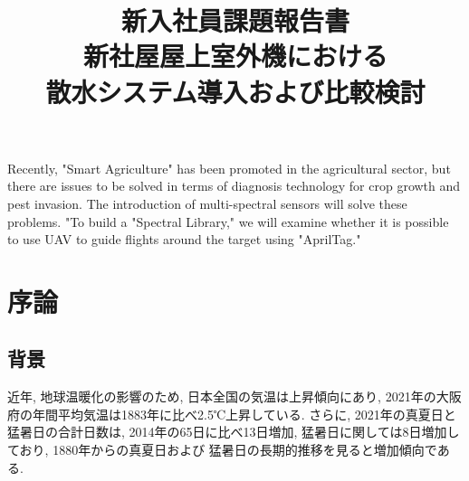\documentclass[a4j,fleqn,dvipdfmx,uplatex]{jsarticle}
\begin{document}
%
\title{新入社員課題報告書\\[2mm]新社屋屋上室外機における\\散水システム導入および比較検討} %
\etitle{} %
\abst
{Recently, "Smart Agriculture" has been promoted in the agricultural sector, but there are issues to be solved in terms of diagnosis technology 
for crop growth and pest invasion. The introduction of multi-spectral sensors will solve these problems. 
"To build a "Spectral Library," we will examine whether it is possible to use UAV to guide flights around the target using "AprilTag."}

\maketitle
\section{序論}\label{sec1}
\subsection{背景}\label{background}
近年, 地球温暖化の影響のため, 日本全国の気温は上昇傾向にあり, 
2021年の大阪府の年間平均気温は1883年に比べ2.5℃上昇している\cite{temp_osaka}. 
さらに, 2021年の真夏日と猛暑日の合計日数は, 2014年の65日に比べ13日増加, 
猛暑日に関しては8日増加しており\cite{temp_osaka2}, 1880年からの真夏日および
猛暑日の長期的推移を見ると増加傾向である\cite{temp_osaka3}. 
\end{document}
